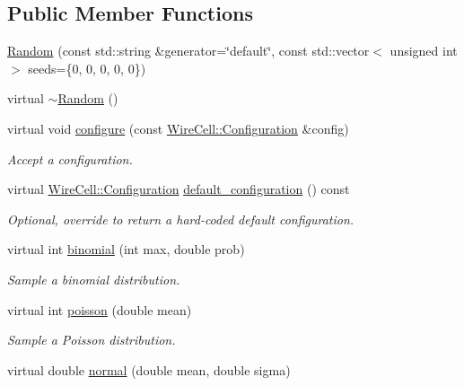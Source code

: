 \subsection*{Public Member Functions}
\begin{DoxyCompactItemize}
\item 
\hyperlink{class_wire_cell_1_1_gen_1_1_random_a081d40d1959772cf64334f6f6896a795}{Random} (const std\+::string \&generator=\char`\"{}default\char`\"{}, const std\+::vector$<$ unsigned int $>$ seeds=\{0, 0, 0, 0, 0\})
\item 
virtual \hyperlink{class_wire_cell_1_1_gen_1_1_random_a25d7fa1d2b2a1dbb64964acbe5162d95}{$\sim$\+Random} ()
\item 
virtual void \hyperlink{class_wire_cell_1_1_gen_1_1_random_ae62de2bc5ed1078fb4f24a7dd0e9bae9}{configure} (const \hyperlink{namespace_wire_cell_a9f705541fc1d46c608b3d32c182333ee}{Wire\+Cell\+::\+Configuration} \&config)
\begin{DoxyCompactList}\small\item\em Accept a configuration. \end{DoxyCompactList}\item 
virtual \hyperlink{namespace_wire_cell_a9f705541fc1d46c608b3d32c182333ee}{Wire\+Cell\+::\+Configuration} \hyperlink{class_wire_cell_1_1_gen_1_1_random_a52d481cf1def8ba466faa65fc20529ef}{default\+\_\+configuration} () const
\begin{DoxyCompactList}\small\item\em Optional, override to return a hard-\/coded default configuration. \end{DoxyCompactList}\item 
virtual int \hyperlink{class_wire_cell_1_1_gen_1_1_random_afb7a7a30f4f5c70a6388dc47c6464153}{binomial} (int max, double prob)
\begin{DoxyCompactList}\small\item\em Sample a binomial distribution. \end{DoxyCompactList}\item 
virtual int \hyperlink{class_wire_cell_1_1_gen_1_1_random_abf2ad8cda2e34f349f073a148dd5ac58}{poisson} (double mean)
\begin{DoxyCompactList}\small\item\em Sample a Poisson distribution. \end{DoxyCompactList}\item 
virtual double \hyperlink{class_wire_cell_1_1_gen_1_1_random_a0efe5c29dec850c78a0013a30f011320}{normal} (double mean, double sigma)

\end{DoxyCompactItemize}
